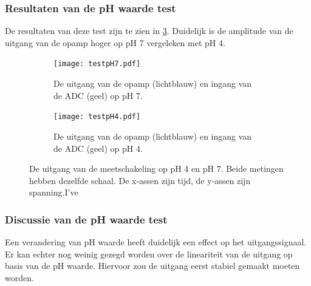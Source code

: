 \subsubsection{Resultaten van de pH waarde test}
De resultaten van deze test zijn te zien in \cref{fig:resultspHMeasure}. Duidelijk is de amplitude van de uitgang van de opamp hoger op pH 7 vergeleken met pH 4.

\begin{figure}[!htbp]
    \centering
    \begin{subfigure}[b]{0.49\textwidth}
        \centering
        \texttt{[image: testpH7.pdf]}
        \caption{De uitgang van de opamp (lichtblauw) en ingang van de ADC (geel) op pH 7.}
        \label{fig:resultpH7}
    \end{subfigure}
    \hfill
    \begin{subfigure}[b]{0.49\textwidth}
        \centering
        \texttt{[image: testpH4.pdf]}
        \caption{De uitgang van de opamp (lichtblauw) en ingang van de ADC (geel) op pH 4.}
        \label{fig:resultpH4}
    \end{subfigure}
    \caption{De uitgang van de meetschakeling op pH 4 en pH 7. Beide metingen hebben dezelfde schaal. De x-assen zijn tijd, de y-assen zijn spanning.I've }
    \label{fig:resultspHMeasure}
\end{figure}

\subsubsection{Discussie van de pH waarde test}
Een verandering van pH waarde heeft duidelijk een effect op het uitgangssignaal. Er kan echter nog weinig gezegd worden over de lineariteit van de uitgang op basis van de pH waarde. Hiervoor zou de uitgang eerst stabiel gemaakt moeten worden.




